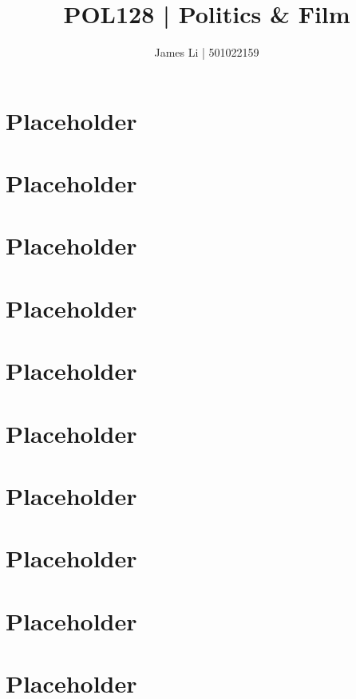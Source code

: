 \documentclass[a4paper]{article}
\title{POL128 | Politics \& Film}
\author{James Li | 501022159}
\date{}
\begin{document}
  \maketitle
  \tableofcontents
  \newpage
  \section{Placeholder} 
  \section{Placeholder} 
  \section{Placeholder} 
  \section{Placeholder} 
  \section{Placeholder} 
  \section{Placeholder} 
  \section{Placeholder} 
  \section{Placeholder} 
  \section{Placeholder} 
  \section{Placeholder} 
\end{document}
